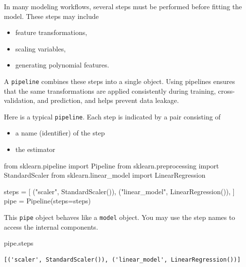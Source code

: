 \documentclass[
  letterpaper,
  DIV=11,
  numbers=noendperiod]{scrreprt}
\newenvironment{Shaded}{\begin{snugshade}}{\end{snugshade}}
\newcommand{\ImportTok}[1]{\textcolor[rgb]{0.00,0.46,0.62}{#1}}
\newcommand{\NormalTok}[1]{\textcolor[rgb]{0.00,0.23,0.31}{#1}}
\newcommand{\OperatorTok}[1]{\textcolor[rgb]{0.37,0.37,0.37}{#1}}
\newcommand{\StringTok}[1]{\textcolor[rgb]{0.13,0.47,0.30}{#1}}
\providecommand{\tightlist}{%
  \setlength{\itemsep}{0pt}\setlength{\parskip}{0pt}}
\theoremstyle{definition}
\theoremstyle{definition}
\theoremstyle{plain}
\theoremstyle{plain}
\theoremstyle{remark}
\begin{document}
In many modeling workflows, several steps must be performed before
fitting the model. These steps may include

\begin{itemize}
\tightlist
\item
  feature transformations,
\item
  scaling variables,
\item
  generating polynomial features.
\end{itemize}

A \texttt{pipeline} combines these steps into a single object. Using
pipelines ensures that the same transformations are applied consistently
during training, cross-validation, and prediction, and helps prevent
data leakage.

Here is a typical \texttt{pipeline}. Each step is indicated by a pair
consisting of

\begin{itemize}
\tightlist
\item
  a name (identifier) of the step
\item
  the estimator
\end{itemize}

\begin{Shaded}
\begin{Highlighting}[]
\ImportTok{from}\NormalTok{ sklearn.pipeline }\ImportTok{import}\NormalTok{ Pipeline}
\ImportTok{from}\NormalTok{ sklearn.preprocessing }\ImportTok{import}\NormalTok{ StandardScaler}
\ImportTok{from}\NormalTok{ sklearn.linear\_model }\ImportTok{import}\NormalTok{ LinearRegression}

\NormalTok{steps }\OperatorTok{=}\NormalTok{ [}
\NormalTok{    (}\StringTok{"scaler"}\NormalTok{, StandardScaler()),}
\NormalTok{    (}\StringTok{"linear\_model"}\NormalTok{, LinearRegression()),}
\NormalTok{]}
\NormalTok{pipe }\OperatorTok{=}\NormalTok{ Pipeline(steps}\OperatorTok{=}\NormalTok{steps)}
\end{Highlighting}
\end{Shaded}

This \texttt{pipe} object behaves like a \texttt{model} object. You may
use the step names to access the internal components.

\begin{Shaded}
\begin{Highlighting}[]
\NormalTok{pipe.steps}
\end{Highlighting}
\end{Shaded}

\begin{verbatim}
[('scaler', StandardScaler()), ('linear_model', LinearRegression())]
\end{verbatim}
\end{document}
